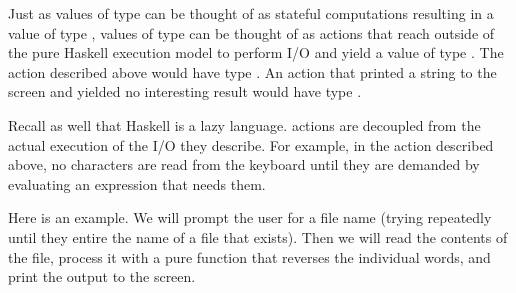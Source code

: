 Just as values of type  can be thought of as stateful computations resulting in a value of type , values
of type  can be thought of as actions that reach outside of the pure Haskell execution model to perform I/O and
yield a value of type . The  action described above would have type . An  action
that printed a string to the screen and yielded no interesting result would have type .

Recall as well that Haskell is a lazy language.  actions are decoupled from the actual execution of the I/O they
describe. For example, in the  action described above, no characters are read from the keyboard until
they are demanded by evaluating an expression that needs them.

Here is an example. We will prompt the user for a file name (trying repeatedly until they entire the name of a file
that exists). Then we will read the contents of the file, process it with a pure function that reverses the individual
words, and print the output to the screen.



